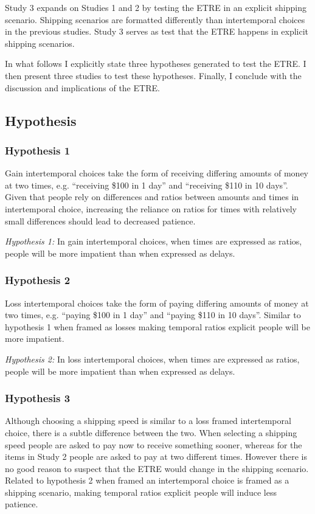 \documentclass[]{article}
\begin{document}
Study 3 expands on Studies 1 and 2 by testing the ETRE in an explicit shipping scenario. 
Shipping scenarios are formatted differently than intertemporal choices in the previous studies.
Study 3 serves as test that the ETRE happens in explicit shipping scenarios. 

In what follows I explicitly state three hypotheses generated to test the ETRE. 
I then present three studies to test these hypotheses. 
Finally, I conclude with the discussion and implications of the ETRE. 


\subsection{Hypothesis}

\subsubsection{Hypothesis 1}
Gain intertemporal choices take the form of receiving differing amounts of money at two times, e.g.  ``receiving \$100  in 1 day'' and ``receiving \$110 in 10 days''.
Given that people rely on differences and ratios between amounts and times in intertemporal choice, increasing the reliance on ratios for times with relatively small differences should lead to decreased patience.


\textit{Hypothesis 1:} In gain intertemporal choices, when times are expressed as ratios, people will be more impatient than when expressed as delays. 

\subsubsection{Hypothesis 2}

Loss intertemporal choices take the form of paying differing amounts of  money at two times, e.g.  ``paying \$100  in 1 day'' and ``paying \$110 in 10 days''.
Similar to hypothesis 1 when framed as losses making temporal ratios explicit people will be more impatient. 

\textit{Hypothesis 2:} In loss intertemporal choices, when times are expressed as ratios, people will be more impatient than when expressed as delays. 


\subsubsection{Hypothesis 3}
Although choosing a shipping speed is similar to a loss framed intertemporal choice, there is a subtle difference between the two.
When selecting a shipping speed people are asked to pay now to receive something sooner, whereas for the items in Study 2 people are asked to pay at two different times. 
However there is no good reason to suspect that the ETRE would change in the shipping scenario.
Related to hypothesis 2 when framed an intertemporal choice is framed as a shipping scenario,  making temporal ratios explicit people will induce less patience. 
\end{document}

